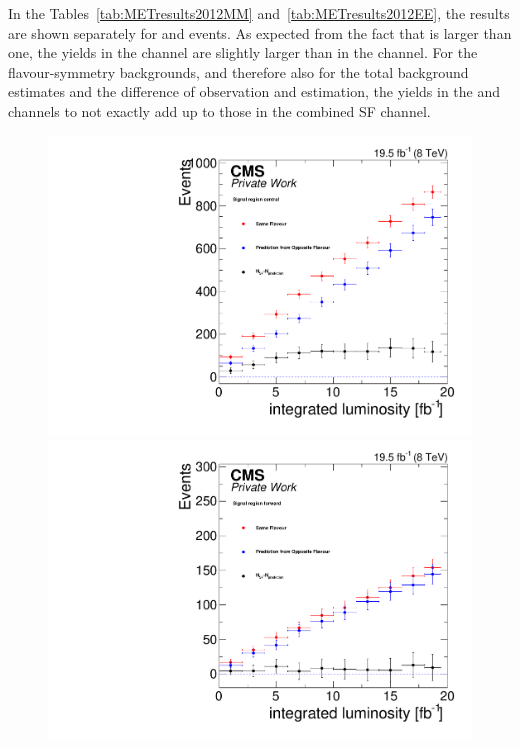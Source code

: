 
In the Tables~\ref{tab:METresults2012MM} and~\ref{tab:METresults2012EE}, the results are shown separately for \EE and \MM events. As expected from the fact that \rmue is larger than one, the yields in the \MM channel are slightly larger than in the \EE channel. For the flavour-symmetry backgrounds, and therefore also for the total background estimates and the difference of observation and estimation, the yields in the \EE and \MM channels to not exactly add up to those in the combined SF channel.  







\begin{figure}[htbp]
\centering
\begin{minipage}[t]{0.49\textwidth}
  \includegraphics[width=\textwidth]{plots/results/YieldvsLumi_SignalCentral_Mll_edgeMassFull2012.pdf}
\end{minipage}
\begin{minipage}[t]{0.49\textwidth}
\includegraphics[width=\textwidth]{plots/results/YieldvsLumi_SignalForward_Mll_edgeMassFull2012.pdf}
\end{minipage}


\end{figure}

